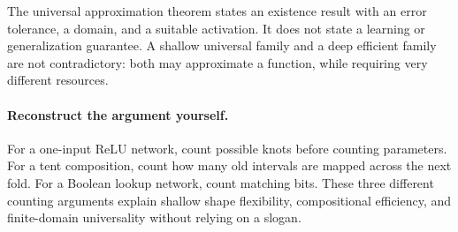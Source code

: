 The universal approximation theorem states an existence result with an error tolerance, a domain, and a suitable activation. It does not state a learning or generalization guarantee. A shallow universal family and a deep efficient family are not contradictory: both may approximate a function, while requiring very different resources.

\paragraph{Reconstruct the argument yourself.}
For a one-input ReLU network, count possible knots before counting parameters. For a tent composition, count how many old intervals are mapped across the next fold. For a Boolean lookup network, count matching bits. These three different counting arguments explain shallow shape flexibility, compositional efficiency, and finite-domain universality without relying on a slogan.
